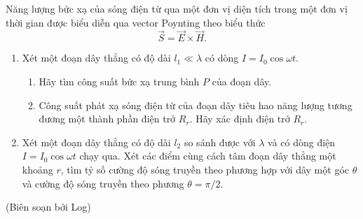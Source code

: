 Năng lượng bức xạ của sóng điện từ qua một đơn vị diện tích trong một đơn vị thời gian được biểu diễn qua vector Poynting theo biểu thức
\begin{equation*}
    \Vec{S} = \Vec{E} \times \Vec{H}.
\end{equation*}

\begin{enumerate}
    \item Xét một đoạn dây thẳng có độ dài $l_1 \ll \lambda$ có dòng $I=I_0 \cos \omega t$. 
    \begin{enumerate}
        \item Hãy tìm công suất bức xạ trung bình $P$ của đoạn dây.
        \item Công suất phát xạ sóng điện từ của đoạn dây tiêu hao năng lượng tương đương một thành phần điện trở $R_r$. Hãy xác định điện trở $R_r$.
    \end{enumerate}
    \item Xét một đoạn dây thẳng có độ dài $l_2$ so sánh được với $\lambda$ và có dòng điện $I=I_0 \cos \omega t$ chạy qua. Xét các điểm cùng cách tâm đoạn dây thẳng một khoảng $r$, tìm tỷ số cường độ sóng truyền theo phương hợp với dây một góc $\theta$ và cường độ sóng truyền theo phương $\theta=\pi/2$.
\end{enumerate}

\begin{flushright}
    (Biên soạn bởi Log)
\end{flushright}